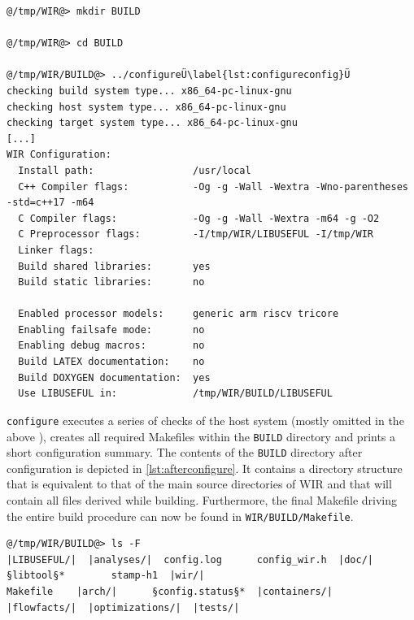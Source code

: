 \begin{lstlisting}[style=commandline,float=h,caption={Execution of \texttt{configure} Script},label=lst:configure]
@/tmp/WIR@> mkdir BUILD

@/tmp/WIR@> cd BUILD

@/tmp/WIR/BUILD@> ../configureÜ\label{lst:configureconfig}Ü
checking build system type... x86_64-pc-linux-gnu
checking host system type... x86_64-pc-linux-gnu
checking target system type... x86_64-pc-linux-gnu
[...]
WIR Configuration:
  Install path:                 /usr/local
  C++ Compiler flags:           -Og -g -Wall -Wextra -Wno-parentheses -std=c++17 -m64
  C Compiler flags:             -Og -g -Wall -Wextra -m64 -g -O2
  C Preprocessor flags:         -I/tmp/WIR/LIBUSEFUL -I/tmp/WIR
  Linker flags:
  Build shared libraries:       yes
  Build static libraries:       no

  Enabled processor models:     generic arm riscv tricore
  Enabling failsafe mode:       no
  Enabling debug macros:        no
  Build LATEX documentation:    no
  Build DOXYGEN documentation:  yes
  Use LIBUSEFUL in:             /tmp/WIR/BUILD/LIBUSEFUL
\end{lstlisting}

\texttt{configure} executes a series of checks of the host system (mostly omitted in the above ), creates all required Makefiles within the \texttt{BUILD} directory and prints a short configuration summary.
The contents of the \texttt{BUILD} directory after configuration is depicted in \cref{lst:afterconfigure}.
It contains a directory structure that is equivalent to that of the main source directories of \gls{WIR} and that will contain all files derived while building.
Furthermore, the final Makefile driving the entire build procedure can now be found in \texttt{WIR/BUILD/Makefile}.

\begin{lstlisting}[style=commandline,float=ht,caption={Directory Listing After \texttt{configure}},label=lst:afterconfigure]
@/tmp/WIR/BUILD@> ls -F
|LIBUSEFUL/|  |analyses/|  config.log      config_wir.h  |doc/|        §libtool§*        stamp-h1  |wir/|
Makefile    |arch/|      §config.status§*  |containers/|   |flowfacts/|  |optimizations/|  |tests/|
\end{lstlisting}

